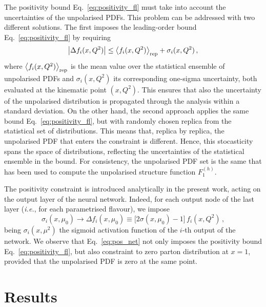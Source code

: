 The positivity bound Eq.~\eqref{eq:positivity_fl} must take into account the uncertainties of the unpolarised PDFs. This problem can be addressed with two different solutions. The first imposes the leading-order bound Eq.~\eqref{eq:positivity_fl} by requiring
\begin{equation}
  \left| \Delta f_i (x,Q^2) \right| \leq \left<f_i (x,Q^2)\right>_{\textrm{rep}} + \sigma_i(x,Q^2) \,,
  \label{eq:positivity_fl_sigma}
\end{equation}
where $\left<f_i (x,Q^2)\right>_{\textrm{rep}}$ is the mean value over the statistical ensemble of unpolarised PDFs and $\sigma_i(x,Q^2)$ its corresponding one-sigma uncertainty, both evaluated at the kinematic point $(x,Q^2)$. This ensures that also the uncertainty of the unpolarised distribution is propagated through the analysis within a standard deviation. On the other hand, the second approach applies the same bound Eq.~\eqref{eq:positivity_fl}, but with randomly chosen replica from the statistical set of distributions. This means that, replica by replica, the unpolarised PDF that enters the constraint is different. Hence, this stocasticity spans the space of distributions, reflecting the uncertainties of the statistical ensemble in the bound. For consistency, the unpolarised PDF set is the same that has been used to compute the unpolarised structure function $F_1^{(h)}$. %

The positivity constraint is introduced analytically in the present work, acting on the output layer of the neural network. Indeed, for each output node of the last layer (\textit{i.e.}, for each parametrised flavour), we impose
\begin{equation}
  \sigma_{i} (x,\mu_0) \rightarrow \Delta f_{i} (x, \mu_0) \equiv \bigl[ 2 \sigma(x,\mu_0) - 1 \bigr] \, f_{i} (x,Q^2) \,,
  \label{eq:pos_net}
\end{equation}
being $\sigma_i(x,\mu^2)$ the sigmoid activation function of the $i$-th output of the network. We observe that Eq.~\eqref{eq:pos_net} not only imposes the positivity bound Eq.~\eqref{eq:positivity_fl}, but also constraint to zero parton distribution at $x=1$, provided that the unpolarised PDF is zero at the same point. 


\section{Results}
\label{sec:4.4}


